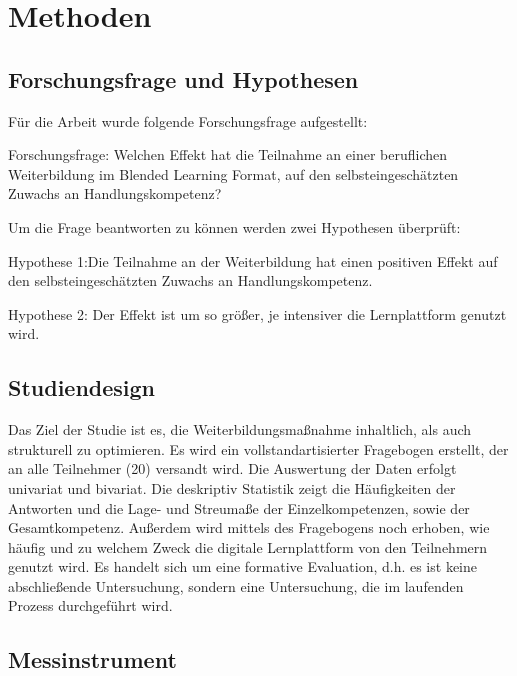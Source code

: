 \documentclass[12pt, bibliography=totoc]{scrartcl}
\begin{document}
\section{Methoden}\label{methoden}

\subsection{Forschungsfrage und
Hypothesen}\label{forschungsfrage-und-hypothesen}

Für die Arbeit wurde folgende Forschungsfrage aufgestellt:

\begin{framed}
Forschungsfrage: Welchen Effekt hat die Teilnahme an einer beruflichen Weiterbildung im Blended Learning Format, auf den selbsteingeschätzten Zuwachs an Handlungskompetenz?
\end{framed}

Um die Frage beantworten zu können werden zwei Hypothesen überprüft:

\begin{framed}
Hypothese 1:Die Teilnahme an der Weiterbildung hat einen positiven Effekt auf den selbsteingeschätzten Zuwachs an Handlungskompetenz.

 Hypothese 2: Der Effekt ist um so größer, je intensiver die Lernplattform genutzt wird.
 \end{framed}

\subsection{Studiendesign}\label{studiendesign}

Das Ziel der Studie ist es, die Weiterbildungsmaßnahme inhaltlich, als
auch strukturell zu optimieren. Es wird ein vollstandartisierter
Fragebogen erstellt, der an alle Teilnehmer (20) versandt wird. Die
Auswertung der Daten erfolgt univariat und bivariat. Die deskriptiv
Statistik zeigt die Häufigkeiten der Antworten und die Lage- und
Streumaße der Einzelkompetenzen, sowie der Gesamtkompetenz. Außerdem
wird mittels des Fragebogens noch erhoben, wie häufig und zu welchem
Zweck die digitale Lernplattform von den Teilnehmern genutzt wird. Es
handelt sich um eine formative Evaluation, d.h. es ist keine
abschließende Untersuchung, sondern eine Untersuchung, die im laufenden
Prozess durchgeführt wird.

\subsection{Messinstrument}\label{messinstrument}
\end{document}
